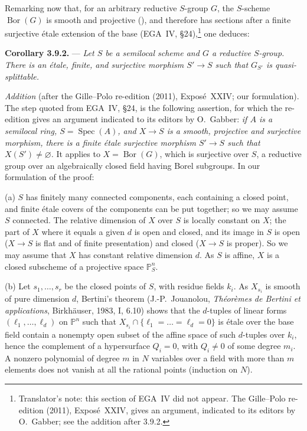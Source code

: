 
Remarking now that, for an arbitrary reductive \(S\)-group \(G\), the
\(S\)-scheme \(\operatorname{Bor}(G)\) is smooth and projective
(), and therefore has sections after a finite
surjective étale extension of the base (EGA~IV, \S24),\footnote{Translator's note: this section of EGA~IV did not appear. The Gille--Polo
re-edition (2011), Exposé~XXIV, gives an argument, indicated to its editors by O.~Gabber; see
the addition after 3.9.2.} one deduces:

\medskip\noindent\textbf{Corollary 3.9.2.} ---
{\itshape Let \(S\) be a semilocal scheme and \(G\) a reductive
\(S\)-group. There is an étale, finite, and surjective morphism
\(S'\to S\) such that \(G_{S'}\) is quasi-splittable.}

\medskip\noindent
\emph{Addition} (after the Gille--Polo re-edition (2011), Exposé~XXIV; our formulation). The step quoted from EGA~IV, \S24, is the following
assertion, for which the re-edition gives an argument indicated to its editors by O.~Gabber:
\emph{if \(A\) is a semilocal ring, \(S=\operatorname{Spec}(A)\), and \(X\to S\) is a smooth,
projective and surjective morphism, there is a finite étale surjective morphism \(S'\to S\) such
that \(X(S')\neq\varnothing\).} It applies to \(X=\operatorname{Bor}(G)\), which is surjective over
\(S\), a reductive group over an algebraically closed field having Borel subgroups. In our
formulation of the proof:

(a) \(S\) has finitely many connected components, each containing a closed point, and finite
étale covers of the components can be put together; so we may assume \(S\) connected. The relative
dimension of \(X\) over \(S\) is locally constant on \(X\); the part of \(X\) where it equals a given
\(d\) is open and closed, and its image in \(S\) is open (\(X\to S\) is flat and of finite
presentation) and closed (\(X\to S\) is proper). So we may assume that \(X\) has constant relative
dimension \(d\). As \(S\) is affine, \(X\) is a closed subscheme of a projective space
\(\mathbb P^n_S\).

(b) Let \(s_1,\dots,s_r\) be the closed points of \(S\), with residue fields \(k_i\). As \(X_{s_i}\) is
smooth of pure dimension \(d\), Bertini's theorem (J.-P.~Jouanolou, \emph{Théorèmes de Bertini et
applications}, Birkhäuser, 1983, I, 6.10) shows that the \(d\)-tuples of linear forms
\((\ell_1,\dots,\ell_d)\) on \(\mathbb P^n\) such that \(X_{s_i}\cap\{\ell_1=\dots=\ell_d=0\}\) is étale
over the base field contain a nonempty open subset of the affine space of such \(d\)-tuples over
\(k_i\), hence the complement of a hypersurface \(Q_i=0\), with \(Q_i\neq0\) of some degree \(m_i\). A
nonzero polynomial of degree \(m\) in \(N\) variables over a field with more than \(m\) elements
does not vanish at all the rational points (induction on \(N\)).

